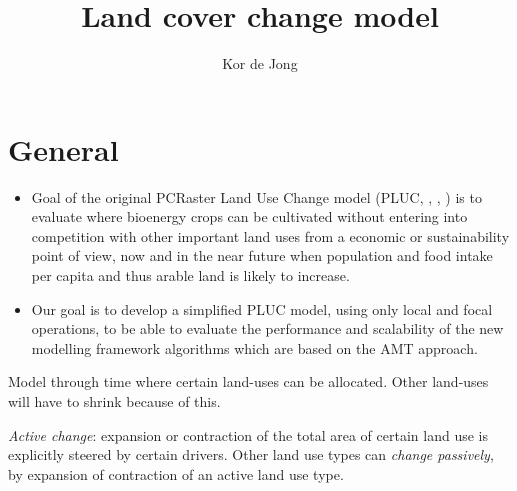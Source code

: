 \documentclass[a4paper,12pt]{article}
\begin{document}
\title{
    Land cover change model
}
\author[1,2]{Kor de Jong}
\maketitle
\tableofcontents

\section{General}
\begin{itemize}
    \item Goal of the original PCRaster Land Use Change model (PLUC,
        \cite{verstegen:2012}, \cite{hilst:2012}, \cite{verstegen:2014})
        is to evaluate where bioenergy crops can be cultivated without
        entering into competition with other important land uses from
        a economic or sustainability point of view, now and in the near
        future when population and food intake per capita and thus arable
        land is likely to increase.
    \item Our goal is to develop a simplified PLUC model, using only
        local and focal operations, to be able to evaluate the performance
        and scalability of the new modelling framework algorithms which
        are based on the AMT approach.
\end{itemize}

Model through time where certain land-uses can be allocated. Other
land-uses will have to shrink because of this.

\emph{Active change}: expansion or contraction of the total area of
certain land use is explicitly steered by certain drivers. Other land
use types can \emph{change passively}, by expansion of contraction of
an active land use type.
\end{document}
